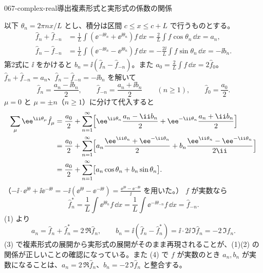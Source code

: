\documentclass[uplatex,dvipdfmx,a4paper,11pt]{jsarticle}
\begin{document}
\begin{mondai}{067-complex-real}{導出}{複素形式と実形式の係数の関係}
\begin{tadashii}
\[\]
以下 $\theta_n=2\pi nx/L$ とし、積分は区間 $c\le x\le c+L$ で行うものとする。
\keisan
{}
\begin{align*}
\hat{f}_n+\hat{f}_{-n}&=\frac{1}{L}\int(\ee^{-\ii\theta_n}+\ee^{\ii\theta_n})f\,\dd x=\frac{2}{L}\int f\cos\theta_n\,\dd x=a_n,\\
\hat{f}_n-\hat{f}_{-n}&=\frac{1}{L}\int(\ee^{-\ii\theta_n}-\ee^{\ii\theta_n})f\,\dd x=-\frac{2\ii}{L}\int f\sin\theta_n\,\dd x=-\ii b_n .
\end{align*}
第2式に $\ii$ をかけると $b_n=\ii(\hat{f}_n-\hat{f}_{-n})$。また $a_0=\frac{2}{L}\int f\,\dd x=2\hat{f}_0$。
 $\hat{f}_n+\hat{f}_{-n}=a_n$、$\hat{f}_n-\hat{f}_{-n}=-\ii b_n$ を解いて
\[
\hat{f}_n=\frac{a_n-\ii b_n}{2},\qquad \hat{f}_{-n}=\frac{a_n+\ii b_n}{2}\qquad(n\ge1),\qquad \hat{f}_0=\frac{a_0}{2}.
\]
 $\mu=0$ と $\mu=\pm n$（$n\ge1$）に分けて代入すると
\begin{align*}
\sum_{\mu}\ee^{\ii\theta_{\mu}}\hat{f}_{\mu}&=\frac{a_0}{2}+\sum_{n=1}^{\infty}\Bigl[\ee^{\ii\theta_n}\frac{a_n-\ii b_n}{2}+\ee^{-\ii\theta_n}\frac{a_n+\ii b_n}{2}\Bigr]\\
&=\frac{a_0}{2}+\sum_{n=1}^{\infty}\Bigl[a_n\frac{\ee^{\ii\theta_n}+\ee^{-\ii\theta_n}}{2}+b_n\frac{\ee^{\ii\theta_n}-\ee^{-\ii\theta_n}}{2\ii}\Bigr]\\
&=\frac{a_0}{2}+\sum_{n=1}^{\infty}\bigl[a_n\cos\theta_n+b_n\sin\theta_n\bigr].
\end{align*}
（$-\ii\cdot\ee^{\ii\theta}+\ii\ee^{-\ii\theta}=-\ii(\ee^{\ii\theta}-\ee^{-\ii\theta})=\frac{\ee^{\ii\theta}-\ee^{-\ii\theta}}{\ii}$ を用いた。）
 $f$ が実数なら
\[
\hat{f}_n^{*}=\frac{1}{L}\int\ee^{\ii\theta_n}f\,\dd x=\frac{1}{L}\int\ee^{-\ii\theta_{-n}}f\,\dd x=\hat{f}_{-n}.
\]
(1) より
\[
a_n=\hat{f}_n+\hat{f}_n^{*}=2\,\Re\hat{f}_n,\qquad b_n=\ii(\hat{f}_n-\hat{f}_n^{*})=\ii\cdot2\ii\,\Im\hat{f}_n=-2\,\Im\hat{f}_n .
\]
\kenzan (3) で複素形式の展開から実形式の展開がそのまま再現されることが、(1)(2) の関係が正しいことの確認になっている。また (4) で $f$ が実数のとき $a_n,b_n$ が実数になることは、$a_n=2\,\Re\hat{f}_n$、$b_n=-2\,\Im\hat{f}_n$ と整合する。
\end{tadashii}
\end{mondai}
\end{document}
